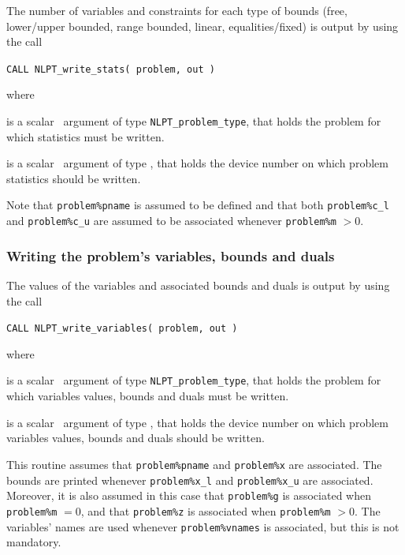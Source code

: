 \documentclass{galahad}
\newcommand{\packagename}{NLPT}
\begin{document}
The number of variables and constraints for each type of bounds (free,
lower/upper bounded, range bounded, linear, equalities/fixed) is output
by using the call
\vspace*{1mm}

\hspace{8mm}
{\tt CALL \packagename\_write\_stats( problem, out )}

\noindent where
\begin{description}
 is a scalar \intentin\ argument of type {\tt NLPT\_problem\_type},
that holds the problem for which statistics must be written.

 is a scalar \intentin\ argument of type \integer, that
holds the device number on which problem statistics should be written.
\end{description}

\noindent
Note that {\tt problem\%pname} is assumed to be defined and that both
{\tt problem\%c\_l} and {\tt problem\%c\_u} are assumed to be associated
whenever {\tt problem\%m} $> 0$.

\subsubsection{Writing the problem's variables, bounds and duals}
\label{w_vars}


The values of the variables and associated bounds and duals is output
by using the call
\vspace*{1mm}

\hspace{8mm}
{\tt CALL \packagename\_write\_variables( problem, out )}

\noindent where
\begin{description}
 is a scalar \intentin\ argument of type {\tt NLPT\_problem\_type},
that holds the problem for which variables values, bounds and duals must be
written.

 is a scalar \intentin\ argument of type \integer, that
holds the device number on which problem variables values, bounds and duals
should be written.
\end{description}

\noindent
This routine assumes that {\tt problem\%pname} and {\tt problem\%x} are
associated. The bounds are printed whenever {\tt problem\%x\_l} and 
{\tt problem\%x\_u} are associated. Moreover, it is also
assumed in this case that {\tt problem\%g} is associated when {\tt problem\%m}
$= 0$, and that {\tt problem\%z}  is associated when {\tt problem\%m} $> 0$. 
The variables' names are used whenever {\tt problem\%vnames} is associated, but
this is not mandatory.
\end{document}
